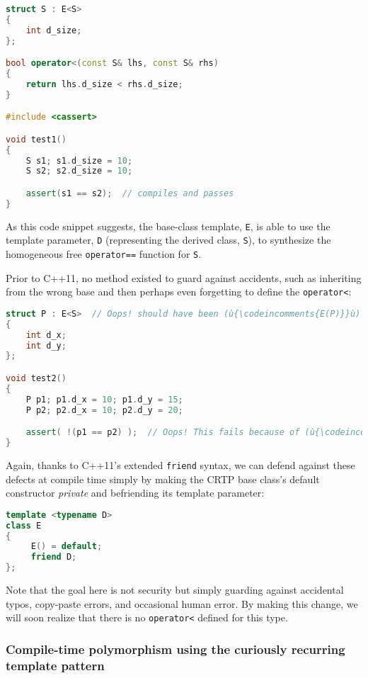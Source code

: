 \begin{lstlisting}[language=C++]
struct S : E<S>
{
    int d_size;
};

bool operator<(const S& lhs, const S& rhs)
{
    return lhs.d_size < rhs.d_size;
}

#include <cassert>

void test1()
{
    S s1; s1.d_size = 10;
    S s2; s2.d_size = 10;

    assert(s1 == s2);  // compiles and passes
}
\end{lstlisting}
    
\noindent As this code snippet suggests, the base-class template, \texttt{E}, is
able to use the template parameter, \texttt{D} (representing the derived
class, \texttt{S}), to synthesize the homogeneous free
\texttt{operator==} function for \texttt{S}.

Prior to C++11, no method existed to guard against accidents, such as
inheriting from the wrong base and then perhaps even forgetting to
define the \texttt{operator<}:

\begin{lstlisting}[language=C++]
struct P : E<S>  // Oops! should have been (ù{\codeincomments{E(P)}}ù) -- a serious latent defect
{
    int d_x;
    int d_y;
};

void test2()
{
    P p1; p1.d_x = 10; p1.d_y = 15;
    P p2; p2.d_x = 10; p2.d_y = 20;

    assert( !(p1 == p2) );  // Oops! This fails because of (ù{\codeincomments{E(S)}}ù) above.
}
\end{lstlisting}
    
\noindent Again, thanks to C++11's extended \texttt{friend} syntax, we can defend
against these defects at compile time simply by making the CRTP base
class's default constructor \emph{private} and befriending its template
parameter:

\begin{lstlisting}[language=C++]
template <typename D>
class E
{
     E() = default;
     friend D;
};
\end{lstlisting}
    
\noindent Note that the goal here is not security but simply guarding against
accidental typos, copy-paste errors, and occasional  human error. By making this change, we will soon realize that there
is no \texttt{operator<} defined for this type.

\subsubsection[Compile-time polymorphism using the curiously recurring template pattern]{Compile-time polymorphism using the curiously recurring template pattern}\label{compile-time-polymorphism-using-crtp}

